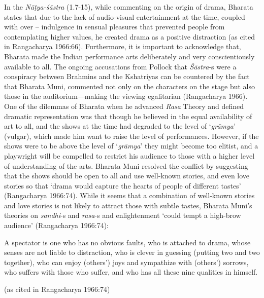 In the \textsl{Nāṭya-śāstra} (1.7-15), while commenting on the origin of drama, Bharata states that due to the lack of audio-visual entertainment at the time, coupled with over -- indulgence in sensual pleasures that prevented people from contemplating higher values, he created drama as a positive distraction (as cited in Rangacharya 1966:66). Furthermore, it is important to acknowledge that, Bharata made the Indian performance arts deliberately and very conscientiously available to all. The ongoing accusations from Pollock
 that \hbox{\textsl{Śāstra}-s} were a conspiracy between Brahmins and the Kshatriyas can be countered by the fact that Bharata Muni, commented not only on the characters on the stage but also those in the auditorium---making the viewing egalitarian (Rangacharya
 1966). One of the dilemmas of Bharata when he advanced \textsl{Rasa} Theory and defined dramatic representation was that though he believed in the equal availability of art to all, and the shows at the time had degraded to the level of ‘\textsl{grāmya}’ (vulgar), which made him want to raise the level of performances. However, if the shows were to be above the level of ‘\textsl{grāmya}' they might become too elitist, and a playwright will be compelled to restrict his audience to those with a higher level of understanding of the arts. Bharata Muni resolved the conflict by suggesting that the shows should be open to all and use well-known stories, and even love stories so that ‘drama would capture the hearts of people of different tastes’ (Rangacharya 1966:74). While it seems that a combination of well-known stories and love stories is not likely to attract those with subtle tastes, Bharata Muni’s theories on \hbox{\textsl{sandhi}-s} and \textsl{rasa}-s and enlightenment ‘could tempt a high-brow audience’ (Rangacharya 1966:74):

\begin{myquote}
A spectator is one who has no obvious faults, who is attached to drama, whose senses are not liable to distraction, who is clever in guessing (putting two and two together), who can enjoy (others’) joys and sympathize with (others’) sorrows, who suffers with those who suffer, and who has all these nine qualities in himself. 

\hfill (as cited in Rangacharya 1966:74)
\end{myquote}


